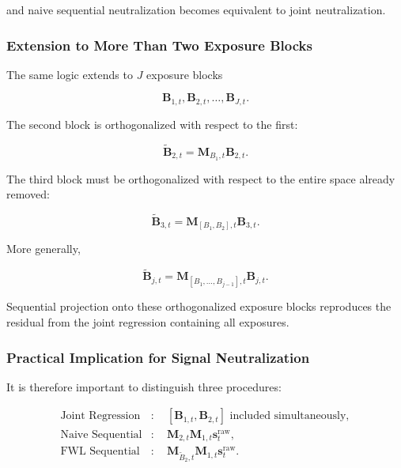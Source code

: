\documentclass[11pt,a4paper]{article}
\begin{document}
and naive sequential neutralization becomes equivalent to joint
neutralization.


\subsubsection{Extension to More Than Two Exposure Blocks}

The same logic extends to $J$ exposure blocks

\begin{equation}
\mathbf{B}_{1,t},
\mathbf{B}_{2,t},
\ldots,
\mathbf{B}_{J,t}.
\end{equation}

The second block is orthogonalized with respect to the first:

\begin{equation}
\widetilde{\mathbf{B}}_{2,t}
=
\mathbf{M}_{B_1,t}
\mathbf{B}_{2,t}.
\end{equation}

The third block must be orthogonalized with respect to the entire space already
removed:

\begin{equation}
\widetilde{\mathbf{B}}_{3,t}
=
\mathbf{M}_{[B_1,B_2],t}
\mathbf{B}_{3,t}.
\end{equation}

More generally,

\begin{equation}
\boxed{
\widetilde{\mathbf{B}}_{j,t}
=
\mathbf{M}_{[B_1,\ldots,B_{j-1}],t}
\mathbf{B}_{j,t}.
}
\end{equation}

Sequential projection onto these orthogonalized exposure blocks reproduces the
residual from the joint regression containing all exposures.


\subsubsection{Practical Implication for Signal Neutralization}

It is therefore important to distinguish three procedures:

\begin{equation}
\boxed{
\begin{aligned}
\text{Joint Regression}
&:
\quad
[\mathbf{B}_{1,t},\mathbf{B}_{2,t}]
\text{ included simultaneously},
\\[0.15cm]
\text{Naive Sequential}
&:
\quad
\mathbf{M}_{2,t}\mathbf{M}_{1,t}
\mathbf{s}_t^{\mathrm{raw}},
\\[0.15cm]
\text{FWL Sequential}
&:
\quad
\mathbf{M}_{\widetilde{B}_2,t}
\mathbf{M}_{1,t}
\mathbf{s}_t^{\mathrm{raw}}.
\end{aligned}
}
\end{equation}
\end{document}
